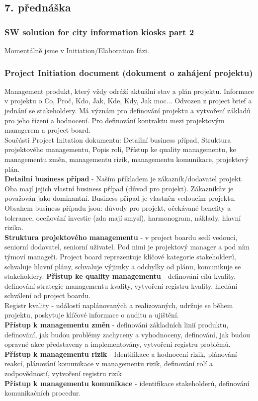 \documentclass[11pt,a4paper]{article}
\begin{document}
    \subsection{7. přednáška}
    \subsubsection{SW solution for city information kiosks part 2 \cite{pres-7}}
        Momentálně jsme v Initiation/Elaboration fázi.\\
    \subsubsection{Project Initiation document (dokument o zahájení projektu)}
        Management produkt, který vždy odráží aktuální stav a plán projektu. Informace v projektu o Co, Proč, Kdo, Jak, Kde, Kdy, Jak moc... Odvozen z project brief a jednání se stakeholdery. Má význám pro definování projektu a vytvoření základů pro jeho řízení a hodnocení. Pro definování kontraktu mezi projektovým managerem a project board.\\
        Součásti Project Initation dokumentu: Detailní business případ, Struktura projektového managementu, Popis rolí, Přístup ke quality managementu, ke managementu změn, managementu rizik, managementu komunikace, projektový plán.\\
        \textbf{Detailní business případ} - Naším příkladem je zákazník/dodavatel projekt. Oba mají jejich vlastní business případ (důvod pro projekt). Zákazníkův je považován jako dominantní. Business případ je vlastněn vedoucím projektu. Obsahem business případu jsou: důvody pro projekt, očekávané benefity a tolerance, oceňování investic (zda mají smysl), harmonogram, náklady, hlavní rizika.\\
        \textbf{Struktura projektového managementu} - v project boardu sedí vedoucí, seniorní dodavatel, seniorní uživatel. Pod nimi je projektový manager a pod ním týmoví manageři. Project board reprezentuje klíčové kategorie stakeholderů, schvaluje hlavní plány, schvaluje výjimky a odchylky od plánu, komunikuje se stakeholdery.
        \textbf{Přístup ke quality managementu} - definování cílů kvality, definování strategie managementu kvality, vytvoření registru kvality, hledání schválení od project boardu.\\
        Registr kvality - událostí naplánovaných a realizovaných, udržuje se během projektu, poskytuje klíčové informace o auditu a ujištění.\\
        \textbf{Přístup k managementu změn} - definování základních linií produktu, definování, jak budou problémy zachyceny a vyhodnoceny, definování, jak budou opravné akce představeny a implementovány, vytvoření registru problémů.\\
        \textbf{Přístup k managementu rizik} - Identifikace a hodnocení rizik, plánování reakcí, plánování komunikace v managementu rizik, definování rolí a zodpovědností, vytvoření registru rizik\\
        \textbf{Přístup k managementu komunikace} - identifikace stakeholderů, definování komunikačních procedur.
\end{document}
